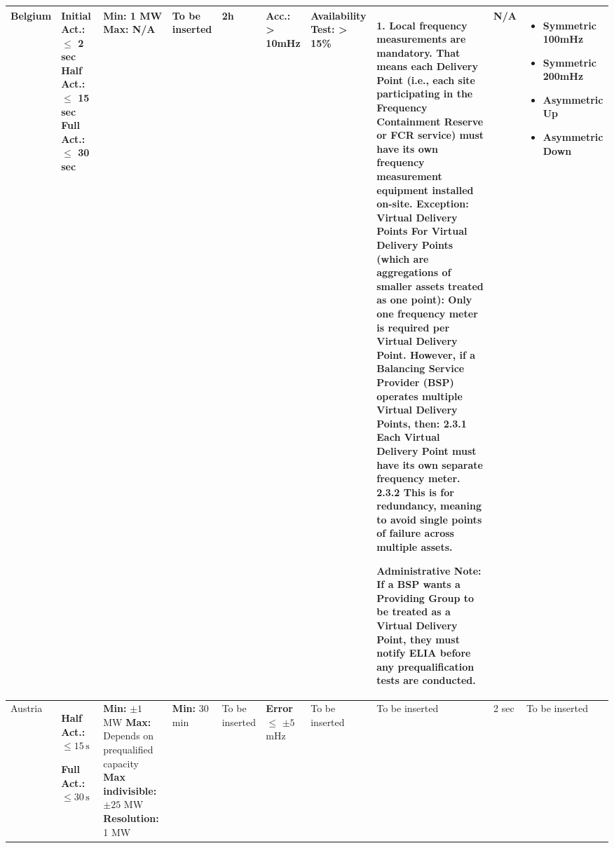 \begin{landscape}
\begin{longtable}{|p{1.8cm}|p{2.2cm}|p{2.2cm}|p{2.2cm}|p{2.5cm}|p{1.5cm}|p{2.2cm}|p{4cm}|p{2.5cm}|p{2cm}|}
Belgium & 
\textbf{Initial Act.:} $\leq$ 2 sec \newline
\textbf{Half Act.:} $\leq$ 15 sec \newline
\textbf{Full Act.:} $\leq$ 30 sec \newline
& 
\textbf{Min: }1 MW 
\newline \textbf{Max: }N/A
& To be inserted & 2h & 
\textbf{Acc.: }> 10mHz
& 
\textbf{Availability Test: }> 15\%
&
1. Local frequency measurements are mandatory. That means each Delivery Point (i.e., each site participating in the Frequency Containment Reserve or FCR service) must have its own frequency measurement equipment installed on-site.  
\newline \textbf{Exception: Virtual Delivery Points}
\newline 2.1 For Virtual Delivery Points (which are aggregations of smaller assets treated as one point): 
\newline 2.2 Only one frequency meter is required per Virtual Delivery Point. 
\newline 2.3 However, if a Balancing Service Provider (BSP) operates multiple Virtual Delivery Points, then: 
\newline \hspace{1em} 2.3.1 Each Virtual Delivery Point must have its own separate frequency meter. 
\newline \hspace{1em} 2.3.2 This is for redundancy, meaning to avoid single points of failure across multiple assets. 

\textbf{Administrative Note:} If a BSP wants a Providing Group to be treated as a Virtual Delivery Point, they must notify ELIA before any prequalification tests are conducted.
& N/A & 
\begin{itemize}[leftmargin=*, nosep]
  \item Symmetric 100mHz
  \item Symmetric 200mHz
  \item Asymmetric Up
  \item Asymmetric Down
\end{itemize}\\
\hline
Austria & 
\textbf{Half Act.:} $\leq 15\,\mathrm{s}$

\textbf{Full Act.:} $\leq 30\,\mathrm{s}$

& 
\textbf{Min: }$\pm 1$ MW
\textbf{Max: }Depends on prequalified capacity
\newline \textbf{Max indivisible: }$\pm 25$ MW
\textbf{Resolution: }1 MW
& 
\textbf{Min: }30 min
& 
To be inserted 
&
\textbf{Error} $\leq$ $\pm 5$ mHz 
& 
To be inserted 
& 
To be inserted 
& 2 sec & To be inserted \\


\end{longtable}
\end{landscape}
